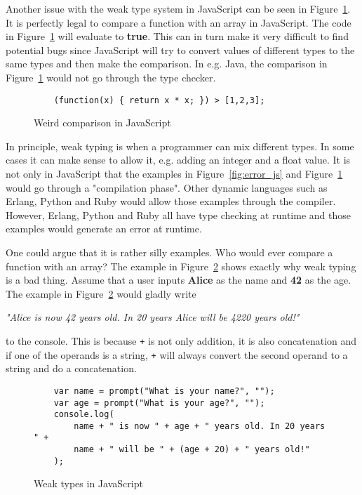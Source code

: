 Another issue with the weak type system in JavaScript can be seen in Figure~\ref{fig:js_comparison}. It is perfectly legal to compare a function with an array in JavaScript. The code in Figure~\ref{fig:js_comparison} will evaluate to \textbf{true}. This can in turn make it very difficult to find potential bugs since JavaScript will try to convert values of different types to the same types and then make the comparison. In e.g. Java, the comparison in Figure~\ref{fig:js_comparison} would not go through the type checker.
\begin{figure}[h]
  \begin{verbatim}
    (function(x) { return x * x; }) > [1,2,3];
  \end{verbatim}
  \caption{Weird comparison in JavaScript}
  \label{fig:js_comparison}
\end{figure}

In principle, weak typing is when a programmer can mix different types. In some cases it can make sense to allow it, e.g. adding an integer and a float value. It is not only in JavaScript that the examples in Figure~\ref{fig:error_js} and Figure~\ref{fig:js_comparison} would go through a "compilation phase". Other dynamic languages such as Erlang, Python and Ruby would allow those examples through the compiler. However, Erlang, Python and Ruby all have type checking at runtime and those examples would generate an error at runtime.

One could argue that it is rather silly examples. Who would ever compare a function with an array? The example in Figure~\ref{fig:js_bad_age} shows exactly why weak typing is a bad thing. Assume that a user inputs \textbf{Alice} as the name and \textbf{42} as the age. The example in Figure~\ref{fig:js_bad_age} would gladly write
\begin{center}
  \emph{"Alice is now 42 years old. In 20 years Alice will be 4220 years old!"}
\end{center}
to the console. This is because {\tt +} is not only addition, it is also concatenation and if one of the operands is a string, {\tt +} will always convert the second operand to a string and do a concatenation.
\begin{figure}[h]
  \begin{verbatim}
    var name = prompt("What is your name?", "");
    var age = prompt("What is your age?", "");
    console.log(
        name + " is now " + age + " years old. In 20 years " +
        name + " will be " + (age + 20) + " years old!"
    );
  \end{verbatim}
  \caption{Weak types in JavaScript}
  \label{fig:js_bad_age}
\end{figure}

